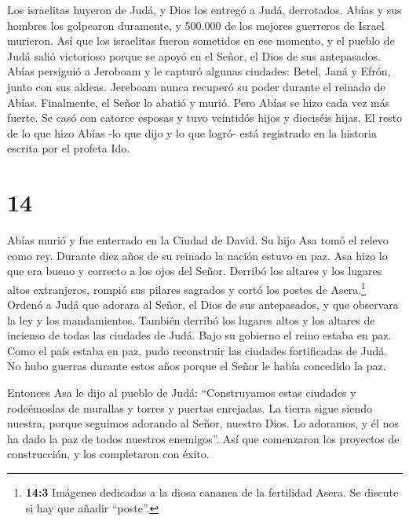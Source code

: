  Los israelitas huyeron de Judá, y Dios los entregó a Judá,
derrotados.  Abías y sus hombres los golpearon duramente, y
500.000 de los mejores guerreros de Israel murieron.  Así
que los israelitas fueron sometidos en ese momento, y el pueblo de Judá
salió victorioso porque se apoyó en el Señor, el Dios de sus
antepasados.  Abías persiguió a Jeroboam y le capturó
algunas ciudades: Betel, Janá y Efrón, junto con sus aldeas.
 Jereboam nunca recuperó su poder durante el reinado de
Abías. Finalmente, el Señor lo abatió y murió.  Pero Abías
se hizo cada vez más fuerte. Se casó con catorce esposas y tuvo
veintidós hijos y dieciséis hijas.  El resto de lo que hizo
Abías -lo que dijo y lo que logró- está registrado en la historia
escrita por el profeta Ido.

\hypertarget{section-13}{%
\section{14}\label{section-13}}

 Abías murió y fue enterrado en la Ciudad de David. Su hijo
Asa tomó el relevo como rey. Durante diez años de su reinado la nación
estuvo en paz.  Asa hizo lo que era bueno y correcto a los
ojos del Señor.  Derribó los altares y los lugares altos
extranjeros, rompió sus pilares sagrados y cortó los postes de
Asera.\footnote{\textbf{14:3} Imágenes dedicadas a la diosa cananea de
  la fertilidad Asera. Se discute si hay que añadir ``poste''.}
 Ordenó a Judá que adorara al Señor, el Dios de sus
antepasados, y que observara la ley y los mandamientos. 
También derribó los lugares altos y los altares de incienso de todas las
ciudades de Judá. Bajo su gobierno el reino estaba en paz. 
Como el país estaba en paz, pudo reconstruir las ciudades fortificadas
de Judá. No hubo guerras durante estos años porque el Señor le había
concedido la paz.

 Entonces Asa le dijo al pueblo de Judá: ``Construyamos
estas ciudades y rodeémoslas de murallas y torres y puertas enrejadas.
La tierra sigue siendo nuestra, porque seguimos adorando al Señor,
nuestro Dios. Lo adoramos, y él nos ha dado la paz de todos nuestros
enemigos''. Así que comenzaron los proyectos de construcción, y los
completaron con éxito.

